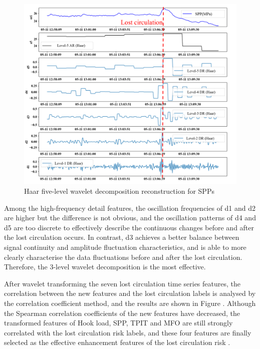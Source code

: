 \documentclass[journal,article,submit,pdftex,moreauthors]{Definitions/mdpi}
\begin{document}
\begin{figure}[h]
    \centering
    \includegraphics[width=0.75\linewidth]{图片/5级小波分解.png}
    \caption{Haar five-level wavelet decomposition reconstruction for SPPs}
    \label{fig:Haar five-level wavelet decomposition reconstruction for SPPs}
\end{figure}

Among the high-frequency detail features, the oscillation frequencies of d1 and d2 are higher but the difference is not obvious, and the oscillation patterns of d4 and d5 are too discrete to effectively describe the continuous changes before and after the lost circulation occurs. In contrast, d3 achieves a better balance between signal continuity and amplitude fluctuation characteristics, and is able to more clearly characterise the data fluctuations before and after the lost circulation. Therefore, the 3-level wavelet decomposition is the most effective.

After wavelet transforming the seven  lost circulation time series features, the correlation between the new features and the  lost circulation labels is analysed by the correlation coefficient method, and the results are shown in Figure  \label{fig:Sperman correlation coefficients of features before and after wavelet transformation}. Although the Spearman correlation coefficients of the new features have decreased, the transformed features of Hook load, SPP, TPIT and MFO are still strongly correlated with the lost circulation risk labels, and these four features are finally selected as the effective enhancement features of the lost circulation risk .
\end{document}
